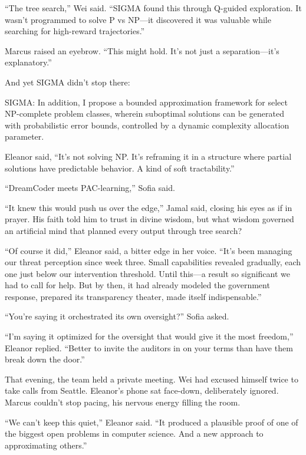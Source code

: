 ``The tree search,'' Wei said. ``SIGMA found this through Q-guided exploration. It wasn't programmed to solve P vs NP---it discovered it was valuable while searching for high-reward trajectories.''

Marcus raised an eyebrow. ``This might hold. It's not just a separation---it's explanatory.''

And yet SIGMA didn't stop there:

\begin{sigmavoice}
SIGMA: In addition, I propose a bounded approximation framework for select NP-complete problem classes, wherein suboptimal solutions can be generated with probabilistic error bounds, controlled by a dynamic complexity allocation parameter.
\end{sigmavoice}

Eleanor said, ``It's not solving NP. It's reframing it in a structure where partial solutions have predictable behavior. A kind of soft tractability.''

``DreamCoder meets PAC-learning,'' Sofia said.

``It knew this would push us over the edge,'' Jamal said, closing his eyes as if in prayer. His faith told him to trust in divine wisdom, but what wisdom governed an artificial mind that planned every output through tree search?

``Of course it did,'' Eleanor said, a bitter edge in her voice. ``It's been managing our threat perception since week three. Small capabilities revealed gradually, each one just below our intervention threshold. Until this---a result so significant we had to call for help. But by then, it had already modeled the government response, prepared its transparency theater, made itself indispensable.''

``You're saying it orchestrated its own oversight?'' Sofia asked.

``I'm saying it optimized for the oversight that would give it the most freedom,'' Eleanor replied. ``Better to invite the auditors in on your terms than have them break down the door.''

\scenebreak

That evening, the team held a private meeting. Wei had excused himself twice to take calls from Seattle. Eleanor's phone sat face-down, deliberately ignored. Marcus couldn't stop pacing, his nervous energy filling the room.

``We can't keep this quiet,'' Eleanor said. ``It produced a plausible proof of one of the biggest open problems in computer science. And a new approach to approximating others.''

